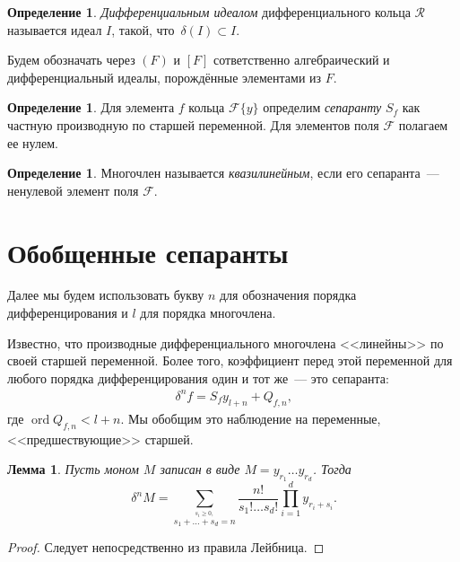 \documentclass[11pt]{article}
\DeclareMathOperator{\ord}{ord}
\renewcommand{\ge}{\geqslant}
\newcommand{\diffField}{\mathcal{F}}
\newtheorem{lemma}[theorem1]{Лемма}
\theoremstyle{plain}
\theoremstyle{definition}
\newtheorem{definition}[theorem2]{Определение}
\theoremstyle{remark}
\begin{document}
\begin{definition}
\emph{Дифференциальным идеалом} дифференциального кольца $\mathcal{R}$ называется идеал $I$, такой, что $\,\delta(I)\subset I$.
\end{definition}

Будем обозначать через $(F)$ и $[F]$ сответственно алгебраический и дифференциальный идеалы, порождённые элементами из $F$.

\begin{definition}
Для элемента $f$ кольца $\diffField\{y\}$ определим \emph{сепаранту} $S_f$
как частную производную по старшей переменной. Для элементов поля $\diffField$ полагаем ее нулем.
\end{definition}

\begin{definition} Многочлен называется \emph{квазилинейным}, если
его сепаранта~--- ненулевой элемент поля $\diffField$.
\end{definition}



\section{Обобщенные сепаранты}
\label{generalized_separants}
Далее мы будем использовать букву $n$ для обозначения порядка дифференцирования и $l$ для порядка многочлена.

Известно, что производные дифференциального многочлена <<линейны>> по своей старшей переменной. Более того, коэффициент перед этой переменной для любого порядка дифференцирования один и тот же~--- это сепаранта:
\begin{gather}
\label{separant_formula}
 \,\delta^n f = S_f y_{l+n} + Q_{f,n},
\end{gather}
где $\ord Q_{f,n} < l + n$.
Мы обобщим это наблюдение на переменные, <<предшествующие>> старшей.


\begin{lemma}\label{lemma:der_monom}
Пусть моном $M$ записан в виде $M=y_{r_1}\ldots y_{r_d}$. Тогда
$$
\,\delta^n M =\sum\limits_{\stackrel{s_i\ge0,}{
s_1+\ldots+s_d=n}}\frac{n!}{s_1!\ldots s_d!}
\prod\limits_{i=1}^dy_{r_i+s_i}.
$$
\end{lemma}
\begin{proof}
Следует непосредственно из правила Лейбница.
\end{proof}
\end{document}
